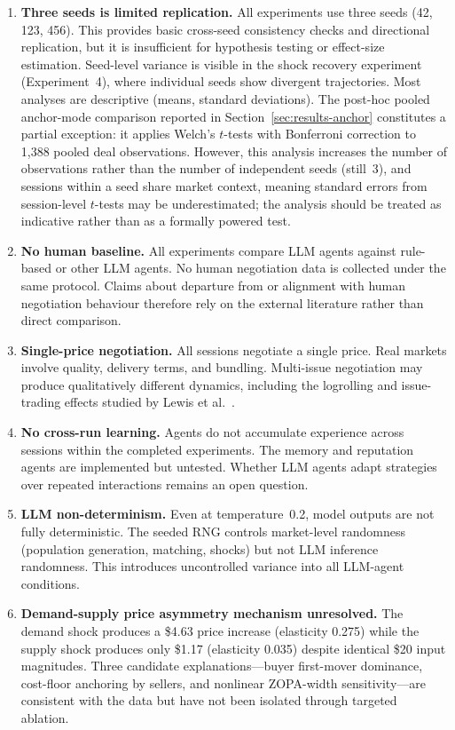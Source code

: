 \begin{enumerate}
    \item \textbf{Three seeds is limited replication.}  All experiments use three seeds (42, 123, 456).  This provides basic cross-seed consistency checks and directional replication, but it is insufficient for hypothesis testing or effect-size estimation.  Seed-level variance is visible in the shock recovery experiment (Experiment~4), where individual seeds show divergent trajectories.  Most analyses are descriptive (means, standard deviations).  The post-hoc pooled anchor-mode comparison reported in Section~\ref{sec:results-anchor} constitutes a partial exception: it applies Welch's $t$-tests with Bonferroni correction to 1{,}388 pooled deal observations.  However, this analysis increases the number of observations rather than the number of independent seeds (still~3), and sessions within a seed share market context, meaning standard errors from session-level $t$-tests may be underestimated; the analysis should be treated as indicative rather than as a formally powered test.

    \item \textbf{No human baseline.}  All experiments compare LLM agents against rule-based or other LLM agents.  No human negotiation data is collected under the same protocol.  Claims about departure from or alignment with human negotiation behaviour therefore rely on the external literature rather than direct comparison.

    \item \textbf{Single-price negotiation.}  All sessions negotiate a single price.  Real markets involve quality, delivery terms, and bundling.  Multi-issue negotiation may produce qualitatively different dynamics, including the logrolling and issue-trading effects studied by Lewis et al.~\cite{lewis2017dealornodeal}.

    \item \textbf{No cross-run learning.}  Agents do not accumulate experience across sessions within the completed experiments.  The memory and reputation agents are implemented but untested.  Whether LLM agents adapt strategies over repeated interactions remains an open question.

    \item \textbf{LLM non-determinism.}  Even at temperature~0.2, model outputs are not fully deterministic.  The seeded RNG controls market-level randomness (population generation, matching, shocks) but not LLM inference randomness.  This introduces uncontrolled variance into all LLM-agent conditions.

    \item \textbf{Demand-supply price asymmetry mechanism unresolved.}  The demand shock produces a \$4.63 price increase (elasticity 0.275) while the supply shock produces only \$1.17 (elasticity 0.035) despite identical \$20 input magnitudes.  Three candidate explanations---buyer first-mover dominance, cost-floor anchoring by sellers, and nonlinear ZOPA-width sensitivity---are consistent with the data but have not been isolated through targeted ablation.
\end{enumerate}
